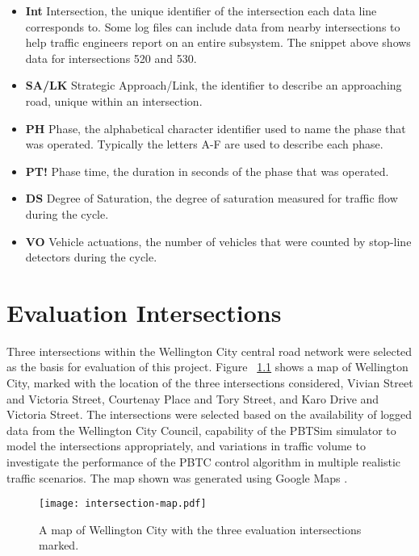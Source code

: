 \begin{appendices}
\begin{itemize}
\item \textbf{Int} Intersection, the unique identifier of the intersection each data line corresponds to. Some log files can include data from nearby intersections to help traffic engineers report on an entire subsystem. The snippet above shows data for intersections 520 and 530.
\item \textbf{SA/LK} Strategic Approach/Link, the identifier to describe an approaching road, unique within an intersection.
\item \textbf{PH} Phase, the alphabetical character identifier used to name the phase that was operated. Typically the letters A-F are used to describe each phase. 
\item \textbf{PT!} Phase time, the duration in seconds of the phase that was operated.
\item \textbf{DS} Degree of Saturation, the degree of saturation measured for traffic flow during the cycle.
\item \textbf{VO} Vehicle actuations, the number of vehicles that were counted by stop-line detectors during the cycle.
\end{itemize}

\chapter{Evaluation Intersections}
\label{appendix:scats_intersections}

Three intersections within the Wellington City central road network were selected as the basis for evaluation of this project. Figure ~\ref{intersectionmap} shows a map of Wellington City, marked with the location of the three intersections considered, Vivian Street and Victoria Street, Courtenay Place and Tory Street, and Karo Drive and Victoria Street. The intersections were selected based on the availability of logged data from the Wellington City Council, capability of the PBTSim simulator to model the intersections appropriately, and variations in traffic volume to investigate the performance of the PBTC control algorithm in multiple realistic traffic scenarios. The map shown was generated using Google Maps \cite{googlemaps}.

\begin{figure}[]
\centering
	\texttt{[image: intersection-map.pdf]}
	\caption{ A map of Wellington City with the three evaluation intersections marked. }
\label{intersectionmap}
\end{figure}



\end{appendices}

